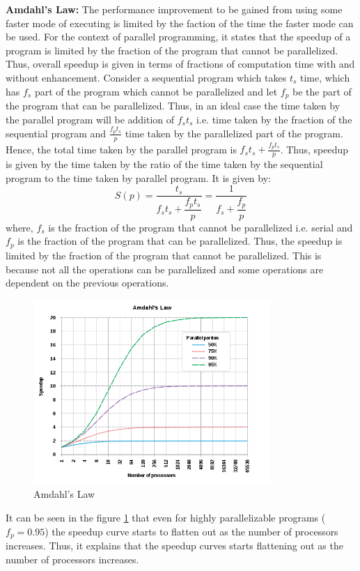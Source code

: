 \documentclass[12pt]{article}
\begin{document}
\begin{itemize}
    \textbf{Amdahl's Law: }The performance improvement to be gained from using some faster mode of executing is limited by the faction of the time the faster mode can be used. For the context of parallel programming,
    it states that the speedup of a program is limited by the fraction of the program that cannot be parallelized. Thus, overall speedup is given in terms of fractions of computation time with and without enhancement. Consider a sequential program which takes $t_s$ time, which has $f_s$ part of the program which cannot be parallelized and let 
    $f_p$ be the part of the program that can be parallelized. Thus, in an ideal case the time taken by the parallel program will be addition of $f_st_s$ i.e. time taken by the fraction of the sequential program and $\frac{f_pt_s}{p}$ time taken by the parallelized part of the program. Hence, the total time taken by the parallel program is $f_st_s + \frac{f_pt_s}{p}$.
    Thus, speedup is given by the time taken by the ratio of the time taken by the sequential program to the time taken by parallel program. It is given by:
    \[ S(p)=\dfrac{t_s}{f_st_s+\dfrac{f_pt_s}{p}}=\dfrac{1}{f_s+\dfrac{f_p}{p}}\]
    where, $f_s$ is the fraction of the program that cannot be parallelized i.e. serial and $f_p$ is the fraction of the program that can be parallelized. Thus, the speedup is limited by the fraction of the program that cannot be parallelized.
    This is because not all the operations can be parallelized and some operations are dependent on the previous operations.
    \begin{figure}[H]
        \centering
        \includegraphics[width=0.8\textwidth]{images/amdahl.png}
        \caption{Amdahl's Law}
        \label{fig:amdahl}
    \end{figure}
    It can be seen in the figure \ref{fig:amdahl} that even for highly parallelizable programs ($f_p=0.95$) the speedup curve starts to flatten out as the number of processors increases.
    Thus, it explains that the speedup curves starts flattening out as the number of processors increases. 


\end{itemize}
\end{document}
